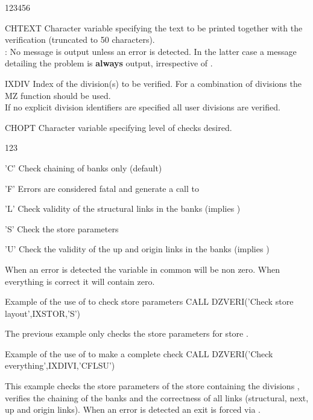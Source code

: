 \begin{DLtt}{123456}
\item[CHTEXT]Character variable specifying the text to be printed
together with the verification (truncated to 50 characters).\\
: No message is output unless an error is detected.
In the latter case a message detailing the problem is
{\bf always} output, irrespective of .
\item[IXDIV]Index of the division(s) to be verified.
\newline For a combination of divisions the MZ function  should
be used.\\
If no explicit division identifiers are specified
all user divisions are verified.
\item[CHOPT]Character variable specifying level of checks desired.
\begin{DLtt}{123}
\item['C']Check chaining of banks only (default)
\item['F']Errors are considered fatal and generate a call to 
\item['L']Check validity of the structural links in the banks
(implies )
\item['S']Check the store parameters
\item['U']Check the validity of the up and origin links in the banks
(implies )
\end{DLtt}
\end{DLtt}

When an error is detected the variable  in common \Lit{/\QUEST/}
will be non zero. When everything is correct it will contain zero.
\newpage
\begin{XMPt}{Example of the use of  to check store parameters}
     CALL DZVERI('Check store layout',IXSTOR,'S')
\end{XMPt}
The previous example only checks the store parameters for store .
\begin{XMPt}{Example of the use of  to make a complete check}
     CALL DZVERI('Check everything',IXDIVI,'CFLSU')
\end{XMPt}
This example checks the store parameters of the store containing
the divisions ,
verifies the chaining of the banks and the correctness of all
links (structural, next, up and origin links). When an error is
detected an exit is forced via .

